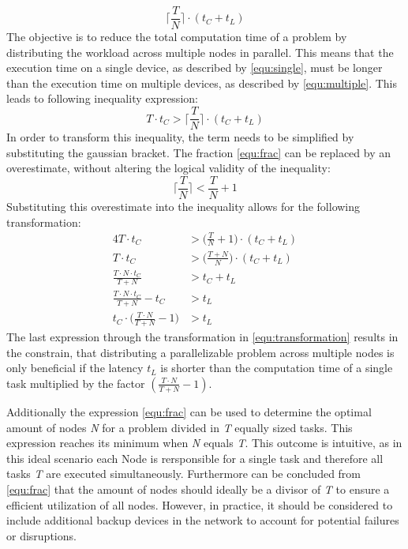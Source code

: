 \begin{equation}
\bigg\lceil\frac{T}{N}\bigg\rceil \cdot (t_{C} + t_{L})
\label{equ:multiple}
\end{equation}
The objective is to reduce the total computation time of a problem by distributing the workload across multiple nodes in parallel. This means that the execution time on a single device, as described by \eqref{equ:single}, must be longer than the execution time on multiple devices, as described by \eqref{equ:multiple}. This leads to following inequality expression:
\begin{equation}
T \cdot t_{C} > \bigg\lceil\frac{T}{N}\bigg\rceil \cdot (t_{C} + t_{L})
\label{equ:compare}
\end{equation}
In order to transform this inequality, the term needs to be simplified by substituting the gaussian bracket. The fraction \eqref{equ:frac} can be replaced by an overestimate, without altering the logical validity of the inequality:
\begin{equation}
\bigg\lceil\frac{T}{N}\bigg\rceil < \frac{T}{N} + 1
\label{equ:frac2}
\end{equation}
Substituting this overestimate into the inequality allows for the following transformation:
\begin{alignat}{4}
 T \cdot t_{C} &> \bigg(\frac{T}{N} + 1\bigg) \cdot (t_{C} + t_{L}) \nonumber \\
 T \cdot t_{C} &> \bigg(\frac{T + N}{N}\bigg) \cdot (t_{C} + t_{L}) \nonumber \\
 \frac{T \cdot N \cdot t_{C}}{T + N} &> t_{C} + t_{L} \nonumber \\
 \frac{T \cdot N \cdot t_{C}}{T + N} - t_{C} &> t_{L} \nonumber \\
 t_{C} \cdot \bigg(\frac{T \cdot N}{T + N} - 1\bigg) &> t_{L}
 \label{equ:transformation}
\end{alignat}
The last expression through the transformation in \eqref{equ:transformation} results in the constrain, that distributing a parallelizable problem across multiple nodes is only beneficial if the latency $t_{L}$ is shorter than the computation time of a single task multiplied by the factor $(\frac{T \cdot N}{T + N} - 1)$.

Additionally the expression \eqref{equ:frac} can be used to determine the optimal amount of nodes \emph{N} for a problem divided in \emph{T} equally sized tasks. This expression reaches its minimum when \emph{N} equals \emph{T}. This outcome is intuitive, as in this ideal scenario each Node is rersponsible for a single task and therefore all tasks \emph{T} are executed simultaneously. Furthermore can be concluded from \eqref{equ:frac} that the amount of nodes should ideally be a divisor of \emph{T} to ensure a efficient utilization of all nodes. However, in practice, it should be considered to include additional backup devices in the network to account for potential failures or disruptions.

